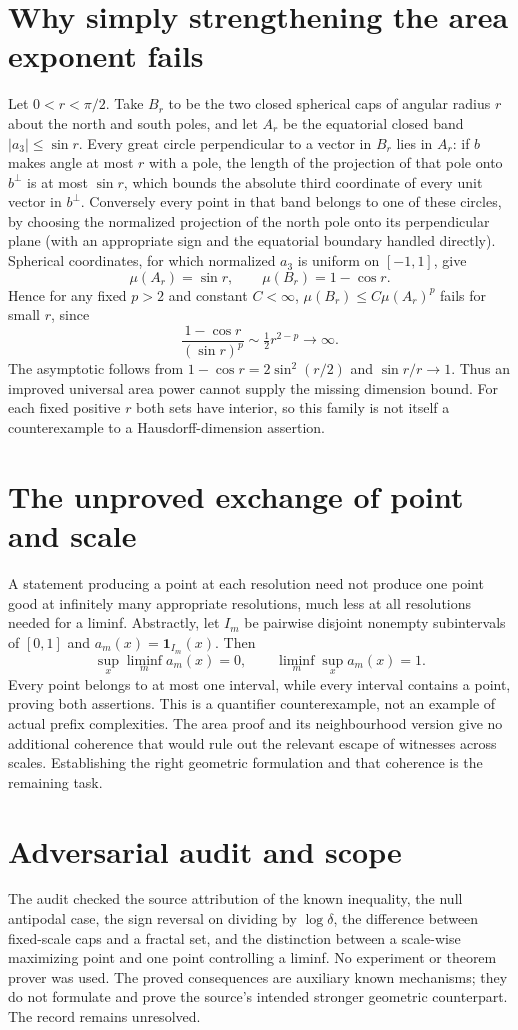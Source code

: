 \documentclass[11pt]{article}
\begin{document}
\section{Why simply strengthening the area exponent fails}
Let $0<r<\pi/2$. Take $B_r$ to be the two closed spherical caps
of angular radius $r$ about the north and south poles, and let
$A_r$ be the equatorial closed band $|a_3|\le\sin r$.
Every great circle perpendicular to a vector in $B_r$ lies in
$A_r$: if $b$ makes angle at most $r$ with a pole, the length of
the projection of that pole onto $b^\perp$ is at most $\sin r$,
which bounds the absolute third coordinate of every unit vector
in $b^\perp$. Conversely every point in that band belongs to
one of these circles, by choosing the normalized projection of
the north pole onto its perpendicular plane (with an appropriate
sign and the equatorial boundary handled directly).
Spherical coordinates, for which normalized $a_3$ is uniform on
$[-1,1]$, give
\[
 \mu(A_r)=\sin r,\qquad \mu(B_r)=1-\cos r.
\]
Hence for any fixed $p>2$ and constant $C<\infty$,
$\mu(B_r)\le C\mu(A_r)^p$ fails for small $r$, since
\[
 \frac{1-\cos r}{(\sin r)^p}\sim\tfrac12 r^{2-p}\longrightarrow\infty.
\]
The asymptotic follows from $1-\cos r=2\sin^2(r/2)$ and
$\sin r/r\to1$. Thus an improved universal area power cannot
supply the missing dimension bound. For each fixed positive $r$
both sets have interior, so this family is not itself a
counterexample to a Hausdorff-dimension assertion.

\section{The unproved exchange of point and scale}
A statement producing a point at each resolution need not produce
one point good at infinitely many appropriate resolutions, much
less at all resolutions needed for a liminf. Abstractly, let
$I_m$ be pairwise disjoint nonempty subintervals of $[0,1]$ and
$a_m(x)=\boldsymbol{1}_{I_m}(x)$. Then
\[
 \sup_x\liminf_m a_m(x)=0,
 \qquad \liminf_m\sup_x a_m(x)=1.
\]
Every point belongs to at most one interval, while every interval
contains a point, proving both assertions. This is a quantifier
counterexample, not an example of actual prefix complexities.
The area proof and its neighbourhood version give no additional
coherence that would rule out the relevant escape of witnesses
across scales. Establishing the right geometric formulation and
that coherence is the remaining task.

\section{Adversarial audit and scope}
The audit checked the source attribution of the known inequality,
the null antipodal case, the sign reversal on dividing by
$\log\delta$, the difference between fixed-scale caps and a
fractal set, and the distinction between a scale-wise maximizing
point and one point controlling a liminf. No experiment or theorem
prover was used. The proved consequences are auxiliary known
mechanisms; they do not formulate and prove the source's intended
stronger geometric counterpart. The record remains unresolved.
\end{document}
